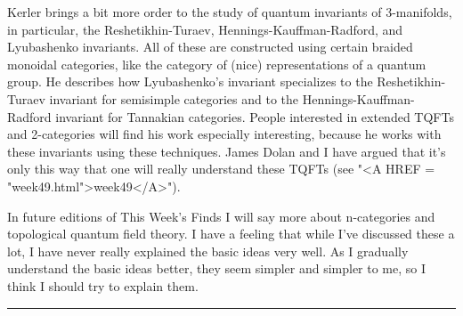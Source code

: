 Kerler brings a bit more order to the study of quantum
invariants of 3-manifolds, in particular, the Reshetikhin-Turaev,
Hennings-Kauffman-Radford, and Lyubashenko invariants.  All of these are
constructed using certain braided monoidal categories, like the category
of (nice) representations of a quantum group.  He describes how
Lyubashenko's invariant specializes to the Reshetikhin-Turaev invariant
for semisimple categories and to the Hennings-Kauffman-Radford invariant
for Tannakian categories.  People interested in extended TQFTs and
2-categories will find his work especially interesting, because he
works with these invariants using these techniques.  James Dolan and I
have argued that it's only this way that one will really understand
these TQFTs (see "<A HREF = "week49.html">week49</A>").  

In future editions of This Week's Finds I will say more about
n-categories and topological quantum field theory.  I have a feeling
that while I've discussed these a lot, I have never really explained the
basic ideas very well.  As I gradually understand the basic ideas
better, they seem simpler and simpler to me, so I think I should try to
explain them.




\par\noindent\rule{\textwidth}{0.4pt}

